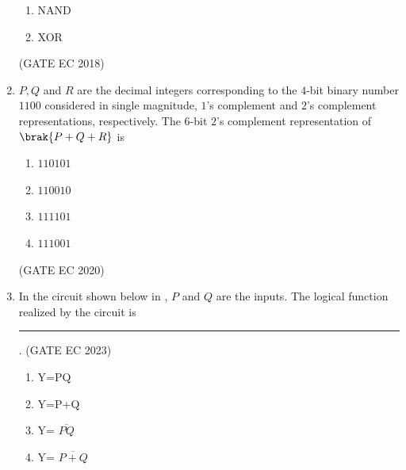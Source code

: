 \begin{enumerate}[label=\arabic*.,ref=\theenumi]
\begin{enumerate}
    \item NAND
    \item XOR
\end{enumerate}
\hfill (GATE EC 2018)
\begin{figure}[H]
\centering
\resizebox{0.75\columnwidth}{!}{%

	}
	\caption{}
\label{fig:GATE-EC 2018,8}
\end{figure}
%
\item $P, Q$ and $R$ are the decimal integers corresponding to the  $4$-bit binary number  $1100$ considered in single magnitude, $1$'s complement and $2$'s complement representations, respectively. The $6$-bit $2$'s complement representation of $\brak{P + Q + R}$ is
\begin{enumerate}
  \item $110101$
  \item $110010$
  \item $111101$
  \item $111001$
\end{enumerate}
   \hfill(GATE EC 2020)
%
\item In the circuit shown below
	in
,
	 $P$ and $Q$ are the inputs. The logical function realized by the circuit 
is \rule{1cm}{0.1pt}.
\hfill(GATE EC 2023)
   \begin{enumerate}
    \item Y=PQ
    \item Y=P+Q    
    \item Y= $\overline{PQ}$
    \item Y= $\overline{P+Q}$
\end{enumerate}
\begin{figure}[H]
\centering
{}
\end{figure}
\end{enumerate}
